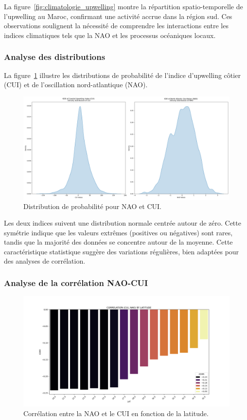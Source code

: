 La figure~\ref{fig:climatologie_upwelling} montre la répartition spatio-temporelle de l'upwelling au Maroc, confirmant une activité accrue dans la région sud. Ces observations soulignent la nécessité de comprendre les interactions entre les indices climatiques tels que la NAO et les processus océaniques locaux.

\subsubsection*{Analyse des distributions}

La figure~\ref{fig:distributions} illustre les distributions de probabilité de l’indice d'upwelling côtier (CUI) et de l'oscillation nord-atlantique (NAO). 

\begin{figure}[H]
\centering
\includegraphics[scale=0.3]{kde_nao_cui.png}
\caption{Distribution de probabilité pour NAO et CUI.}
\label{fig:distributions}
\end{figure}

Les deux indices suivent une distribution normale centrée autour de zéro. Cette symétrie indique que les valeurs extrêmes (positives ou négatives) sont rares, tandis que la majorité des données se concentre autour de la moyenne. Cette caractéristique statistique suggère des variations régulières, bien adaptées pour des analyses de corrélation.

\subsubsection*{Analyse de la corrélation NAO-CUI}
\begin{figure}[H]
\centering
\includegraphics[scale=0.3]{corr.png}
\caption{Corrélation entre la NAO et le CUI en fonction de la latitude.}
\label{fig:correlation}
\end{figure}

